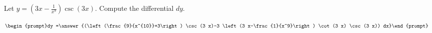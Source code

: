 \documentclass{ximera}
\author{Bart Snapp}
\begin{document}
\begin{exercise}

Let $y= \left(3 x-\frac{1}{x^9}\right) \csc (3 x)$. Compute the differential $dy$.

\[
\begin{prompt}dy =\answer{(\left(\frac{9}{x^{10}}+3\right) \csc (3 x)-3 \left(3 x-\frac{1}{x^9}\right) \cot (3 x) \csc (3 x)) dx}\end{prompt}
\]
\end{exercise}
\end{document}

